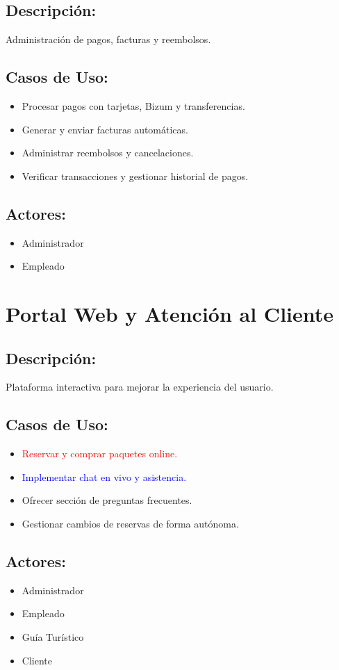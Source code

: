 \subsection*{Descripci\'on:}
Administraci\'on de pagos, facturas y reembolsos.

\subsection*{Casos de Uso:}
\begin{itemize}
    \item Procesar pagos con tarjetas, Bizum y transferencias.
    \item Generar y enviar facturas autom\'aticas.
    \item Administrar reembolsos y cancelaciones.
    \item Verificar transacciones y gestionar historial de pagos.
\end{itemize}

\subsection*{Actores:}
\begin{itemize}
    \item Administrador
    \item Empleado
\end{itemize}

\section{Portal Web y Atenci\'on al Cliente}

\subsection*{Descripci\'on:}
Plataforma interactiva para mejorar la experiencia del usuario.

\subsection*{Casos de Uso:}
\begin{itemize}
    \item \textcolor{red}{Reservar y comprar paquetes online.}
    \item \textcolor{blue}{Implementar chat en vivo y asistencia.}
    \item Ofrecer secci\'on de preguntas frecuentes.
    \item Gestionar cambios de reservas de forma aut\'onoma.
\end{itemize}

\subsection*{Actores:}
\begin{itemize}
    \item Administrador
    \item Empleado
    \item Guía Tur\'istico
    \item Cliente
\end{itemize}
